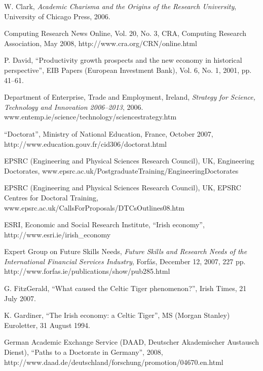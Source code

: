 \documentclass{article}
\begin{document}
\begin{thebibliography}{99.}

W. Clark, {\em Academic Charisma and the Origins of the Research 
University}, University of Chicago Press, 2006.  

Computing Research News Online, Vol. 20, No. 3,
CRA, Computing Research Association, May 2008,
http://www.cra.org/CRN/online.html

P. David, ``Productivity growth prospects and the new economy in 
historical perspective'', EIB Papers (European Investment Bank), 
Vol. 6, No. 1, 2001, pp. 41--61.

Department of Enterprise, Trade and Employment, Ireland, 
{\em Strategy for Science, Technology and Innovation 2006--2013}, 
2006.  www.entemp.ie/science/technology/sciencestrategy.htm

``Doctorat'', Ministry of National Education, France, October 2007, 
http://www.education.gouv.fr/cid306/doctorat.html



EPSRC (Engineering and Physical Sciences Research Council), UK, 
Engineering Doctorates, 
www.epsrc.ac.uk/PostgraduateTraining/EngineeringDoctorates

EPSRC (Engineering and Physical Sciences Research Council), UK, 
EPSRC Centres for Doctoral Training, 
www.epsrc.ac.uk/CallsForProposals/DTCsOutlines08.htm

ESRI, Economic and Social Research Institute, ``Irish economy'', 
http://www.esri.ie/irish\_economy



Expert Group on Future Skills Needs, 
{\em Future Skills and Research Needs of the 
International Financial Services Industry}, Forf\'as, December 12, 2007,
227 pp. 
http://www.forfas.ie/publications/show/pub285.html

G. FitzGerald, ``What caused the Celtic Tiger phenomenon?'', Irish Times,
21 July 2007.

K. Gardiner, ``The Irish economy: a Celtic Tiger'', MS (Morgan Stanley) 
Euroletter, 31 August 1994.  

German Academic Exchange Service (DAAD, Deutscher Akademischer Austausch 
Dienst), ``Paths to a Doctorate in Germany'', 2008, 
http://www.daad.de/deutschland/forschung/promotion/04670.en.html


\end{thebibliography}
\end{document}

